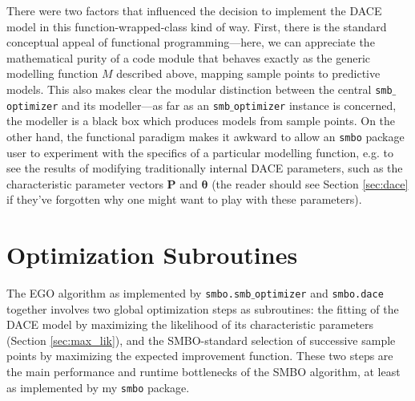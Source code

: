There were two factors that influenced the decision to implement the DACE model in this function-wrapped-class kind of way.
First, there is the standard conceptual appeal of functional programming---here, we can appreciate the mathematical purity of a code module that behaves exactly as the generic modelling function $M$ described above, mapping sample points to predictive models. This also makes clear the modular distinction between the central \texttt{smb$\_$optimizer} and its modeller---as far as an \texttt{smb$\_$optimizer} instance is concerned, the modeller is a black box which produces models from sample points. On the other hand, the functional paradigm makes it awkward to allow an \texttt{smbo} package user to experiment with the specifics of a particular modelling function, e.g. to see the results of modifying traditionally internal DACE parameters, such as the characteristic parameter vectors $\mathbf{P}$ and $\mathbf{\theta}$ (the reader should see Section \ref{sec:dace} if they've forgotten why one might want to play with these parameters). 


\begin{minipage}{\textwidth}
\begin{framed}

\end{framed}

\label{fig:smb_optimizer}

\end{minipage}



\begin{minipage}{\textwidth}
\begin{framed}

\end{framed}

\label{fig:dace_doc}

\end{minipage}

\section{Optimization Subroutines}
The EGO algorithm as implemented by \texttt{smbo.smb$\_$optimizer} and \texttt{smbo.dace} together involves two global optimization steps as subroutines: the fitting of the DACE model by maximizing the likelihood of its characteristic parameters (Section \ref{sec:max_lik}), and the SMBO-standard selection of successive sample points by maximizing the expected improvement function. These two steps are the main performance and runtime bottlenecks of the SMBO algorithm, at least as implemented by my \texttt{smbo} package.

